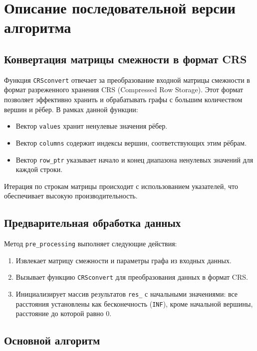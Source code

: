 \documentclass[a4paper,14pt]{extarticle}
\begin{document}
\section*{Описание последовательной версии алгоритма}

\subsection*{Конвертация матрицы смежности в формат CRS}

Функция \texttt{CRSconvert} отвечает за преобразование входной матрицы смежности в формат разреженного хранения CRS (Compressed Row Storage). Этот формат позволяет эффективно хранить и обрабатывать графы с большим количеством вершин и рёбер. В рамках данной функции:
\begin{itemize}
    \item Вектор \texttt{values} хранит ненулевые значения рёбер.
    \item Вектор \texttt{columns} содержит индексы вершин, соответствующих этим рёбрам.
    \item Вектор \texttt{row\_ptr} указывает начало и конец диапазона ненулевых значений для каждой строки.
\end{itemize}
Итерация по строкам матрицы происходит с использованием указателей, что обеспечивает высокую производительность.

\subsection*{Предварительная обработка данных}

Метод \texttt{pre\_processing} выполняет следующие действия:
\begin{enumerate}
    \item Извлекает матрицу смежности и параметры графа из входных данных.
    \item Вызывает функцию \texttt{CRSconvert} для преобразования данных в формат CRS.
    \item Инициализирует массив результатов \texttt{res\_} с начальными значениями: все расстояния установлены как бесконечность (\texttt{INF}), кроме начальной вершины, расстояние до которой равно 0.
\end{enumerate}

\subsection*{Основной алгоритм}
\end{document}
